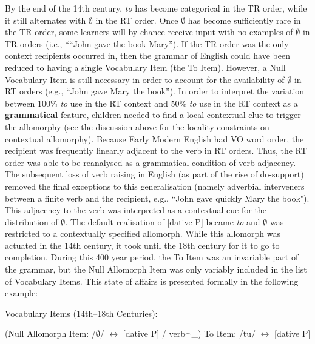 	By the end of the 14th century, \textit{to} has become categorical in the TR order, while it still alternates with $\emptyset$ in the RT order. Once $\emptyset$ has become sufficiently rare in the TR order, some learners will by chance receive input with no examples of $\emptyset$ in TR orders (i.e., *``John gave the book Mary''). If the TR order was the only context recipients occurred in, then the grammar of English could have been reduced to having a single Vocabulary Item (the To Item). However, a Null Vocabulary Item is still necessary in order to account for the availability of $\emptyset$ in RT orders (e.g., ``John gave Mary the book''). In order to interpret the variation between 100\% \textit{to} use in the RT context and 50\% \textit{to} use in the RT context as a \textbf{grammatical} feature, children needed to find a local contextual clue to trigger the allomorphy (see the discussion above for the locality constraints on contextual allomorphy). Because Early Modern English had VO word order, the recipient was frequently linearly adjacent to the verb in RT orders. Thus, the RT order was able to be reanalysed as a grammatical condition of verb adjacency. The subsequent loss of verb raising in English (as part of the rise of do-support) removed the final exceptions to this generalisation (namely adverbial interveners between a finite verb and the recipient, e.g., ``John gave quickly Mary the book"). This adjacency to the verb was interpreted as a contextual cue for the distribution of $\emptyset$. The default realisation of [dative P] became \textit{to} and $\emptyset$ was restricted to a contextually specified allomorph. While this allomorph was actuated in the 14th century, it took until the 18th century for it to go to completion. During this 400 year period, the To Item was an invariable part of the grammar, but the Null Allomorph Item was only variably included in the list of Vocabulary Items. This state of affairs is presented formally in the following example:

	\begin{exe}
		\ex Vocabulary Items (14th--18th Centuries):
		\begin{xlist}
			\ex (Null Allomorph Item: /$\emptyset$/ $\leftrightarrow$ [dative P] / verb$^{\smallfrown}$\_)
			\ex To Item: /tu/ $\leftrightarrow$ [dative P]
		\end{xlist}
	\end{exe}

